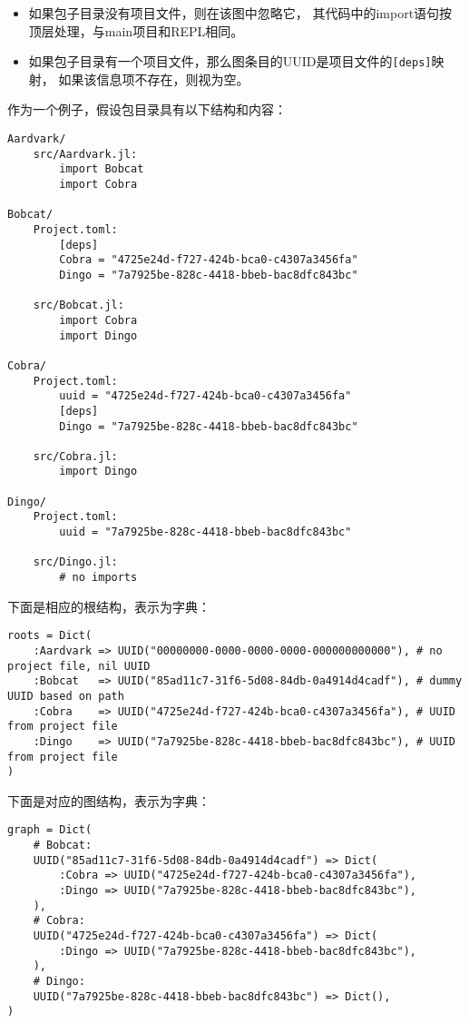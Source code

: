 \begin{itemize}
\item 如果包子目录没有项目文件，则在该图中忽略它， 其代码中的import语句按顶层处理，与main项目和REPL相同。


\item 如果包子目录有一个项目文件，那么图条目的UUID是项目文件的\texttt{[deps]}映射， 如果该信息项不存在，则视为空。

\end{itemize}


作为一个例子，假设包目录具有以下结构和内容：




\begin{lstlisting}
Aardvark/
    src/Aardvark.jl:
        import Bobcat
        import Cobra

Bobcat/
    Project.toml:
        [deps]
        Cobra = "4725e24d-f727-424b-bca0-c4307a3456fa"
        Dingo = "7a7925be-828c-4418-bbeb-bac8dfc843bc"

    src/Bobcat.jl:
        import Cobra
        import Dingo

Cobra/
    Project.toml:
        uuid = "4725e24d-f727-424b-bca0-c4307a3456fa"
        [deps]
        Dingo = "7a7925be-828c-4418-bbeb-bac8dfc843bc"

    src/Cobra.jl:
        import Dingo

Dingo/
    Project.toml:
        uuid = "7a7925be-828c-4418-bbeb-bac8dfc843bc"

    src/Dingo.jl:
        # no imports
\end{lstlisting}



下面是相应的根结构，表示为字典：




\begin{verbatim}
roots = Dict(
    :Aardvark => UUID("00000000-0000-0000-0000-000000000000"), # no project file, nil UUID
    :Bobcat   => UUID("85ad11c7-31f6-5d08-84db-0a4914d4cadf"), # dummy UUID based on path
    :Cobra    => UUID("4725e24d-f727-424b-bca0-c4307a3456fa"), # UUID from project file
    :Dingo    => UUID("7a7925be-828c-4418-bbeb-bac8dfc843bc"), # UUID from project file
)
\end{verbatim}



下面是对应的图结构，表示为字典：




\begin{verbatim}
graph = Dict(
    # Bobcat:
    UUID("85ad11c7-31f6-5d08-84db-0a4914d4cadf") => Dict(
        :Cobra => UUID("4725e24d-f727-424b-bca0-c4307a3456fa"),
        :Dingo => UUID("7a7925be-828c-4418-bbeb-bac8dfc843bc"),
    ),
    # Cobra:
    UUID("4725e24d-f727-424b-bca0-c4307a3456fa") => Dict(
        :Dingo => UUID("7a7925be-828c-4418-bbeb-bac8dfc843bc"),
    ),
    # Dingo:
    UUID("7a7925be-828c-4418-bbeb-bac8dfc843bc") => Dict(),
)
\end{verbatim}




